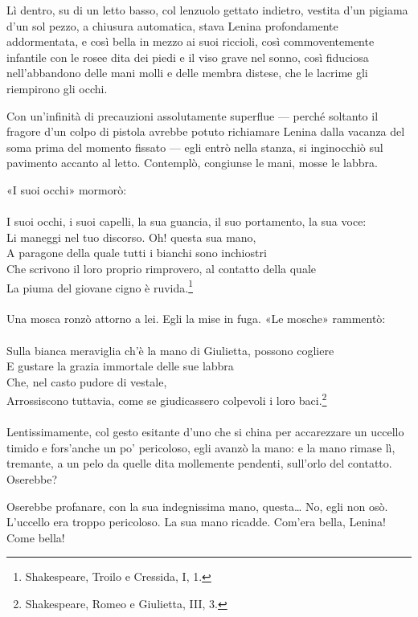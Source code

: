 \documentclass[
a5paper, %
10pt, %
twoside, 
onecolumn, %
openany, %
]{memoir}
\begin{document}
Lì dentro, su di un letto basso, col lenzuolo gettato indietro, vestita d’un pigiama d’un sol pezzo, a chiusura automatica, stava Lenina profondamente addormentata, e così bella in mezzo ai suoi riccioli, così commoventemente infantile con le rosee dita dei piedi e il viso grave nel sonno, così fiduciosa nell’abbandono delle mani molli e delle membra distese, che le lacrime gli riempirono gli occhi.

Con un’infinità di precauzioni assolutamente superflue — perché soltanto il fragore d’un colpo di pistola avrebbe potuto richiamare Lenina dalla vacanza del soma prima del momento fissato — egli entrò nella stanza, si inginocchiò sul pavimento accanto al letto. Contemplò, congiunse le mani, mosse le labbra.

«I suoi occhi» mormorò:
\leavevmode\\\leavevmode\\
{\tiny I suoi occhi, i suoi capelli, la sua guancia, il suo portamento, la sua voce:\\
Li maneggi nel tuo discorso. Oh! questa sua mano,\\
A paragone della quale tutti i bianchi sono inchiostri\\
Che scrivono il loro proprio rimprovero, al contatto della quale\\
La piuma del giovane cigno è ruvida.}\footnote{Shakespeare, Troilo e Cressida, I, 1.}
\leavevmode\\\leavevmode\\
Una mosca ronzò attorno a lei. Egli la mise in fuga. «Le mosche» rammentò:
\leavevmode\\\leavevmode\\
{\tiny Sulla bianca meraviglia ch’è la mano di Giulietta, possono cogliere\\
E gustare la grazia immortale delle sue labbra\\
Che, nel casto pudore di vestale,\\
Arrossiscono tuttavia, come se giudicassero colpevoli i loro baci.}\footnote{Shakespeare, Romeo e Giulietta, III, 3.}
\leavevmode\\\leavevmode\\
Lentissimamente, col gesto esitante d’uno che si china per accarezzare un uccello timido e fors’anche un po’ pericoloso, egli avanzò la mano: e la mano rimase lì, tremante, a un pelo da quelle dita mollemente pendenti, sull’orlo del contatto. Oserebbe?

Oserebbe profanare, con la sua indegnissima mano, questa… No, egli non osò. L’uccello era troppo pericoloso. La sua mano ricadde. Com’era bella, Lenina! Come bella!
\end{document}
